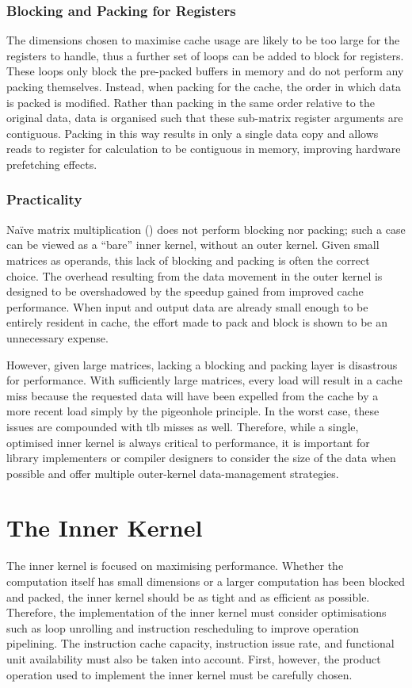 \documentclass[\main/thesis.tex]{subfiles}
\begin{document}
\subsubsection{Blocking and Packing for Registers}
The dimensions chosen to maximise cache usage are likely to be too large for the registers to handle, thus a further set of loops can be added to block for registers.
These loops only block the pre-packed buffers in memory and do not perform any packing themselves.
Instead, when packing for the cache, the order in which data is packed is modified.
Rather than packing in the same order relative to the original data, data is organised such that these sub-matrix register arguments are contiguous.
Packing in this way results in only a single data copy and allows reads to register for calculation to be contiguous in memory, improving hardware prefetching effects.

\subsubsection{Practicality}
Na\"ive matrix multiplication (\ie {}) does not perform blocking nor packing; such a case can be viewed as a ``bare'' inner kernel, without an outer kernel.
Given small matrices as operands, this lack of blocking and packing is often the correct choice.
The overhead resulting from the data movement in the outer kernel is designed to be overshadowed by the speedup gained from improved cache performance.
When input and output data are already small enough to be entirely resident in cache, the effort made to pack and block is shown to be an unnecessary expense.

However, given large matrices, lacking a blocking and packing layer is disastrous for performance.
With sufficiently large matrices, every load will result in a cache miss because the requested data will have been expelled from the cache by a more recent load simply by the pigeonhole principle.
In the worst case, these issues are compounded with \gls{tlb} misses as well.
Therefore, while a single, optimised inner kernel is always critical to performance, it is important for library implementers or compiler designers to consider the size of the data when possible and offer multiple outer-kernel data-management strategies.

\section{The Inner Kernel}
\label{sec:innerKernel}
The inner kernel is focused on maximising performance.
Whether the computation itself has small dimensions or a larger computation has been blocked and packed, the inner kernel should be as tight and as efficient as possible.
Therefore, the implementation of the inner kernel must consider optimisations such as loop unrolling and instruction rescheduling to improve operation pipelining.
The instruction cache capacity, instruction issue rate, and functional unit availability must also be taken into account.
First, however, the product operation used to implement the inner kernel must be carefully chosen.
\end{document}
